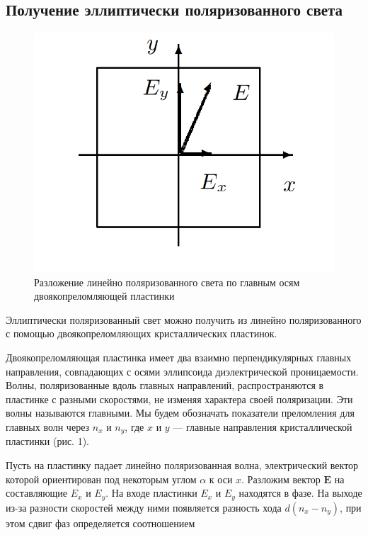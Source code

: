 \documentclass[a4paper, 12pt]{article}%
\begin{document}
	\subsection{Получение эллиптически поляризованного света}
	\begin{figure} 
		\includegraphics[width=\linewidth]{1}
		\caption{Разложение линейно поляризованного света по главным осям двоякопреломляющей пластинки}
		\label{ris 1}
	\end{figure}
	
	Эллиптически поляризованный свет можно получить из линейно поляризованного с
	помощью двоякопреломляющих кристаллических пластинок.
	
	Двоякопреломляющая пластинка имеет два взаимно перпендикулярных главных направления, совпадающих с осями эллипсоида диэлектрической проницаемости. Волны, поляризованные вдоль главных направлений, распространяются в пластинке с разными скоростями, не изменяя характера своей поляризации. Эти волны называются главными. Мы будем обозначать показатели преломления для главных волн через $ n_x $ и $ n_y $, где $ x $ и $ y $ --- главные направления кристаллической пластинки (рис. 1).
	
	Пусть на пластинку падает линейно поляризованная волна, электрический вектор которой ориентирован под некоторым углом $ \alpha $ к оси
	$ x $. Разложим вектор $ \mathbf{E} $ на составляющие $ E_x $ и $ E_y $. На входе пластинки $ E_x $ и $ E_y $ находятся в фазе. На выходе из-за разности скоростей между ними появляется разность хода $ d(n_x - n_y) $, при этом сдвиг фаз определяется соотношением
	
\end{document}
